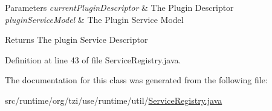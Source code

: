 \begin{DoxyParams}{Parameters}
{\em current\-Plugin\-Descriptor} & The Plugin Descriptor \\
\hline
{\em plugin\-Service\-Model} & The Plugin Service Model \\
\hline
\end{DoxyParams}
\begin{DoxyReturn}{Returns}
The plugin Service Descriptor 
\end{DoxyReturn}


Definition at line 43 of file Service\-Registry.\-java.



The documentation for this class was generated from the following file\-:\begin{DoxyCompactItemize}
\item 
src/runtime/org/tzi/use/runtime/util/\hyperlink{_service_registry_8java}{Service\-Registry.\-java}\end{DoxyCompactItemize}

